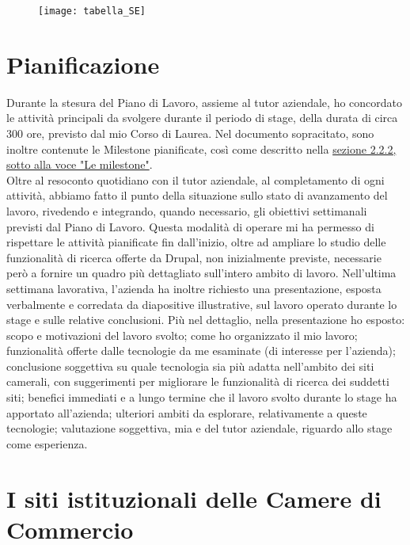 	\begin{figure}[htbp]
		\label{img:confronto_SE}
		\begin{center}
			\texttt{[image: tabella\_SE]}
		\end{center}
	\end{figure}
	
	\section{Pianificazione}
	Durante la stesura del Piano di Lavoro, assieme al tutor aziendale, ho concordato le attività principali da svolgere durante il periodo di stage, della durata di circa 300 ore, previsto dal mio Corso di Laurea. Nel documento sopracitato, sono inoltre contenute le \gls{Milestone} pianificate, così come descritto nella \hyperref[subsub:milestone]{sezione 2.2.2, sotto alla voce "Le milestone"}. \\
	Oltre al resoconto quotidiano con il tutor aziendale, al completamento di ogni attività, abbiamo fatto il punto della situazione sullo stato di avanzamento del lavoro, rivedendo e integrando, quando necessario, gli obiettivi settimanali previsti dal Piano di Lavoro. Questa modalità di operare mi ha permesso di rispettare le attività pianificate fin dall'inizio, oltre ad ampliare lo studio delle funzionalità di ricerca offerte da \gls{Drupal}, non inizialmente previste, necessarie però a fornire un quadro più dettagliato sull'intero ambito di lavoro.
	Nell'ultima settimana lavorativa, l'azienda ha inoltre richiesto una presentazione, esposta verbalmente e corredata da diapositive illustrative, sul lavoro operato durante lo stage e sulle relative conclusioni. Più nel dettaglio, nella presentazione ho esposto: scopo e motivazioni del lavoro svolto; come ho organizzato il mio lavoro; funzionalità offerte dalle tecnologie da me esaminate (di interesse per l'azienda); conclusione soggettiva su quale tecnologia sia più adatta nell'ambito dei siti camerali, con suggerimenti per migliorare le funzionalità di ricerca dei suddetti siti; benefici immediati e a lungo termine che il lavoro svolto durante lo stage ha apportato all'azienda; ulteriori ambiti da esplorare, relativamente a queste tecnologie; valutazione soggettiva, mia e del tutor aziendale, riguardo allo stage come esperienza. \\
	
	\section{I siti istituzionali delle Camere di Commercio}

